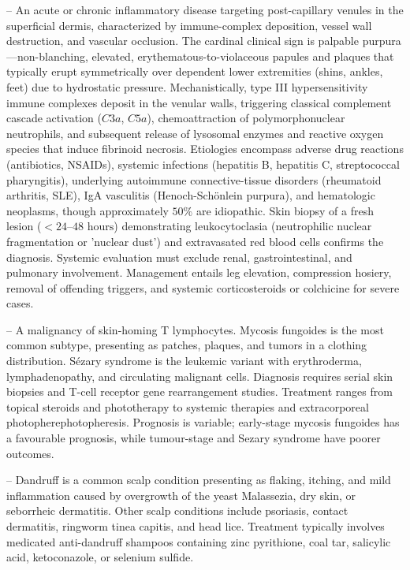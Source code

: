 -- An acute or chronic inflammatory disease targeting post-capillary venules in the superficial dermis, characterized by immune-complex deposition, vessel wall destruction, and vascular occlusion. The cardinal clinical sign is palpable purpura---non-blanching, elevated, erythematous-to-violaceous papules and plaques that typically erupt symmetrically over dependent lower extremities (shins, ankles, feet) due to hydrostatic pressure. Mechanistically, type III hypersensitivity immune complexes deposit in the venular walls, triggering classical complement cascade activation ($C3a$, $C5a$), chemoattraction of polymorphonuclear neutrophils, and subsequent release of lysosomal enzymes and reactive oxygen species that induce fibrinoid necrosis. Etiologies encompass adverse drug reactions (antibiotics, NSAIDs), systemic infections (hepatitis B, hepatitis C, streptococcal pharyngitis), underlying autoimmune connective-tissue disorders (rheumatoid arthritis, SLE), IgA vasculitis (Henoch-Schönlein purpura), and hematologic neoplasms, though approximately $50\%$ are idiopathic. Skin biopsy of a fresh lesion ($<24\text{--}48\text{ hours}$) demonstrating leukocytoclasia (neutrophilic nuclear fragmentation or 'nuclear dust') and extravasated red blood cells confirms the diagnosis. Systemic evaluation must exclude renal, gastrointestinal, and pulmonary involvement. Management entails leg elevation, compression hosiery, removal of offending triggers, and systemic corticosteroids or colchicine for severe cases.

-- A malignancy of skin-homing T lymphocytes. Mycosis fungoides is the most common subtype, presenting as patches, plaques, and tumors in a clothing distribution. Sézary syndrome is the leukemic variant with erythroderma, lymphadenopathy, and circulating malignant cells. Diagnosis requires serial skin biopsies and T-cell receptor gene rearrangement studies. Treatment ranges from topical steroids and phototherapy to systemic therapies and extracorporeal photopherephotopheresis. Prognosis is variable; early-stage mycosis fungoides has a favourable prognosis, while tumour-stage and Sezary syndrome have poorer outcomes.

-- Dandruff is a common scalp condition presenting as flaking, itching, and mild inflammation caused by overgrowth of the yeast Malassezia, dry skin, or seborrheic dermatitis. Other scalp conditions include psoriasis, contact dermatitis, ringworm tinea capitis, and head lice. Treatment typically involves medicated anti-dandruff shampoos containing zinc pyrithione, coal tar, salicylic acid, ketoconazole, or selenium sulfide.

